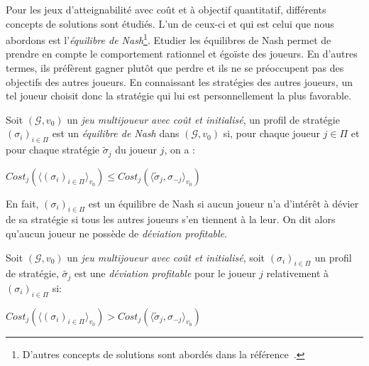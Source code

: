 






Pour les jeux d'atteignabilité avec coût et à objectif quantitatif, différents concepts de solutions sont étudiés. L'un de ceux-ci et qui est celui que nous abordons est l'\emph{équilibre de Nash}\footnote{D'autres concepts de solutions sont abordés dans la référence~\cite{juliePhd}.}. Etudier les équilibres de Nash permet de prendre en compte le comportement rationnel et égoïste des joueurs. En d'autres termes, ils préfèrent gagner plutôt que perdre et ils ne se préoccupent pas des objectifs des autres joueurs. En connaissant les stratégies des autres joueurs, un tel joueur choisit donc la stratégie qui lui est personnellement la plus favorable.

\begin{defi}
	
	Soit $(\mathcal{G}, v_{0})$ un \textit{jeu multijoueur avec coût et initialisé}, un profil de stratégie $(\sigma _{i})_{i \in \Pi}$ est un \textit{équilibre de Nash} dans $(\mathcal{G}, v_{0})$ si, pour chaque joueur $j \in \Pi$ et pour chaque stratégie $\tilde{\sigma}_{j}$ du joueur $j$, on a :
	\begin{center}$ Cost_{j}(\langle (\sigma _{i})_{i \in \Pi}\rangle_{v_0}) \leq Cost_{j}(\langle \tilde{\sigma} _{j} ,\sigma _{-j}\rangle_{v_0})$ \end{center}
\end{defi}	


En fait, $(\sigma_i)_{i \in \Pi}$ est un équilibre de Nash si aucun joueur n'a d'intérêt à dévier de sa stratégie si tous les autres joueurs s'en tiennent à la leur. On dit alors qu'aucun joueur ne possède de \emph{déviation profitable}.


\begin{defi}
	
	Soit $(\mathcal{G}, v_{0})$ un \textit{jeu multijoueur avec coût et initialisé}, soit $(\sigma _{i})_{i \in \Pi}$ un profil de stratégie, $\tilde{\sigma _{j}}$ est une \textit{déviation profitable} pour le joueur $j$ relativement à $(\sigma _{i})_{i \in \Pi}$ si:
	\begin{center} $ Cost_{j}(\langle (\sigma _{i})_{i \in \Pi} \rangle_{v_0}) > Cost_{j}(\langle \tilde{\sigma} _{j} ,\sigma _{-j} \rangle_{v_0})$ \end{center}
\end{defi}



